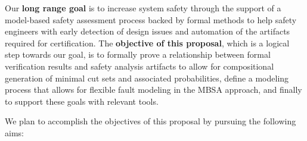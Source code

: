 Our \textbf{long range goal} is to increase system safety through the support of a model-based safety assessment process backed by formal methods to help safety engineers with early detection of design issues and automation of the artifacts required for certification. The \textbf{objective of this proposal}, which is a logical step towards our goal, is to formally prove a relationship between formal verification results and safety analysis artifacts to allow for compositional generation of minimal cut sets and associated probabilities, define a modeling process that allows for flexible fault modeling in the MBSA approach, and finally to support these goals with relevant tools.
%
\iffalse
The main focus of this research work is to define algorithms and formulate theoretical proofs that make use of verification results in order to extract information about the fault model. The secondary focus is the development of a safety analysis tool that works closely with existing verification engines and implements the theories in the first step.
\fi
%
We plan to accomplish the objectives of this proposal by pursuing the following aims:

